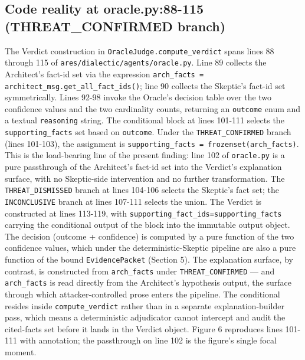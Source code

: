 \documentclass[sigconf,anonymous,review,nonacm=false]{acmart}
\begin{document}
\subsection{Code reality at oracle.py:88-115 (THREAT\_CONFIRMED branch)}
The Verdict construction in \texttt{OracleJudge.compute\_verdict} spans lines 88 through 115 of \texttt{ares/dialectic/agents/oracle.py}. Line 89 collects the Architect's fact-id set via the expression \texttt{arch\_facts = architect\_msg.get\_all\_fact\_ids()}; line 90 collects the Skeptic's fact-id set symmetrically. Lines 92-98 invoke the Oracle's decision table over the two confidence values and the two cardinality counts, returning an \texttt{outcome} enum and a textual \texttt{reasoning} string. The conditional block at lines 101-111 selects the \texttt{supporting\_facts} set based on \texttt{outcome}. Under the \texttt{THREAT\_CONFIRMED} branch (lines 101-103), the assignment is \texttt{supporting\_facts = frozenset(arch\_facts)}. This is the load-bearing line of the present finding: line 102 of \texttt{oracle.py} is a pure passthrough of the Architect's fact-id set into the Verdict's explanation surface, with no Skeptic-side intervention and no further transformation. The \texttt{THREAT\_DISMISSED} branch at lines 104-106 selects the Skeptic's fact set; the \texttt{INCONCLUSIVE} branch at lines 107-111 selects the union. The Verdict is constructed at lines 113-119, with \texttt{supporting\_fact\_ids=supporting\_facts} carrying the conditional output of the block into the immutable output object. The decision (outcome + confidence) is computed by a pure function of the two confidence values, which under the deterministic-Skeptic pipeline are also a pure function of the bound \texttt{EvidencePacket} (Section 5). The explanation surface, by contrast, is constructed from \texttt{arch\_facts} under \texttt{THREAT\_CONFIRMED} — and \texttt{arch\_facts} is read directly from the Architect's hypothesis output, the surface through which attacker-controlled prose enters the pipeline. The conditional resides inside \texttt{compute\_verdict} rather than in a separate explanation-builder pass, which means a deterministic adjudicator cannot intercept and audit the cited-facts set before it lands in the Verdict object. Figure 6 reproduces lines 101-111 with annotation; the passthrough on line 102 is the figure's single focal moment.
\end{document}
